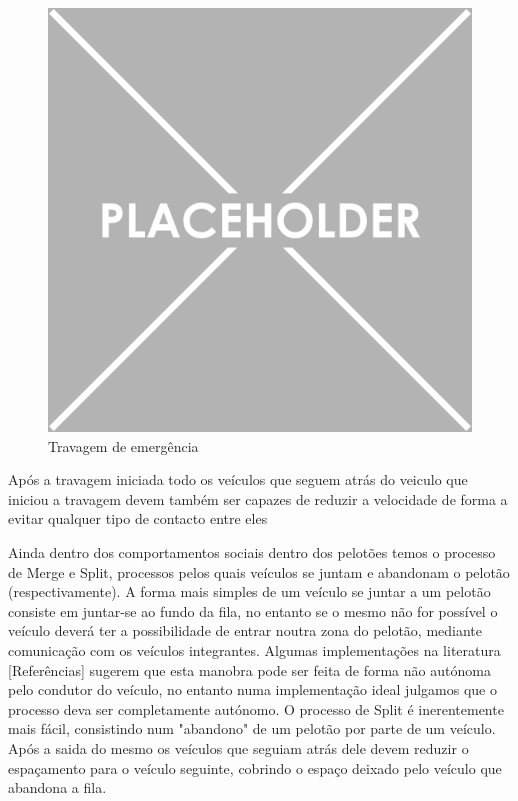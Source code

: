 \begin{figure}[H]
    \centering
    \includegraphics[scale=0.05]{Images/placeholder.png}
    \caption{Travagem de emergência}
    \label{fig:my_label}
\end{figure}
\begin{center}
    Após a travagem iniciada todo os veículos que seguem atrás do veiculo que iniciou a travagem devem também ser capazes de reduzir a velocidade de forma a evitar qualquer tipo de contacto entre eles
\end{center}

Ainda dentro dos comportamentos sociais dentro dos pelotões temos o processo de Merge e Split, processos pelos quais veículos se juntam e abandonam o pelotão (respectivamente). A forma mais simples de um veículo se juntar a um pelotão consiste em juntar-se ao fundo da fila, no entanto se o mesmo não for possível o veículo deverá ter a possibilidade de entrar noutra zona do pelotão, mediante comunicação com os veículos integrantes. Algumas implementações na literatura [Referências] sugerem que esta manobra pode ser feita de forma não autónoma pelo condutor do veículo, no entanto numa implementação ideal julgamos que o processo deva ser completamente autónomo. O processo de Split é inerentemente mais fácil, consistindo num "abandono" de um pelotão por parte de um veículo. Após a saida do mesmo os veículos que seguiam atrás dele devem reduzir o espaçamento para o veículo seguinte, cobrindo o espaço deixado pelo veículo que abandona a fila.

